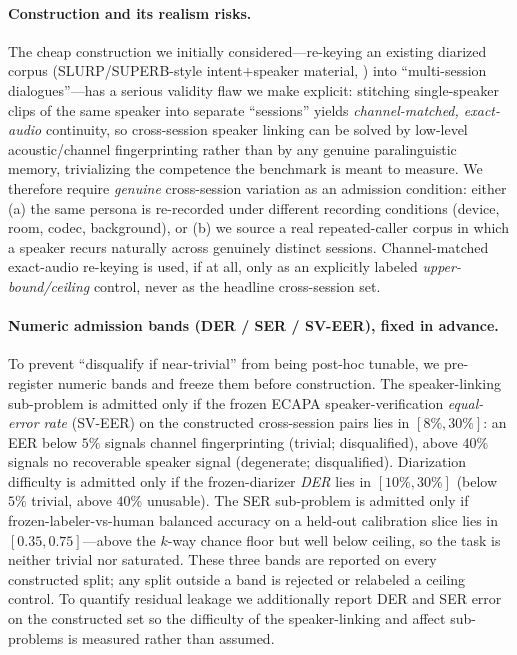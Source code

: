 \paragraph{Construction and its realism risks.} The cheap construction we initially considered---re-keying an existing diarized corpus (SLURP/SUPERB-style intent+speaker material, \citealp{slurp2020,superb2021,dynsuperb2023}) into ``multi-session dialogues''---has a serious validity flaw we make explicit: stitching single-speaker clips of the same speaker into separate ``sessions'' yields \emph{channel-matched, exact-audio} continuity, so cross-session speaker linking can be solved by low-level acoustic/channel fingerprinting rather than by any genuine paralinguistic memory, trivializing the competence the benchmark is meant to measure. We therefore require \emph{genuine} cross-session variation as an admission condition: either (a) the same persona is re-recorded under different recording conditions (device, room, codec, background), or (b) we source a real repeated-caller corpus in which a speaker recurs naturally across genuinely distinct sessions. Channel-matched exact-audio re-keying is used, if at all, only as an explicitly labeled \emph{upper-bound/ceiling} control, never as the headline cross-session set.

\paragraph{Numeric admission bands (DER / SER / SV-EER), fixed in advance.} To prevent ``disqualify if near-trivial'' from being post-hoc tunable, we pre-register numeric bands and freeze them before construction. The speaker-linking sub-problem is admitted only if the frozen ECAPA speaker-verification \emph{equal-error rate} (SV-EER) on the constructed cross-session pairs lies in $[8\%,30\%]$: an EER below $5\%$ signals channel fingerprinting (trivial; disqualified), above $40\%$ signals no recoverable speaker signal (degenerate; disqualified). Diarization difficulty is admitted only if the frozen-diarizer \emph{DER} lies in $[10\%,30\%]$ (below $5\%$ trivial, above $40\%$ unusable). The SER sub-problem is admitted only if frozen-labeler-vs-human balanced accuracy on a held-out calibration slice lies in $[0.35,0.75]$---above the $k$-way chance floor but well below ceiling, so the task is neither trivial nor saturated. These three bands are reported on every constructed split; any split outside a band is rejected or relabeled a ceiling control. To quantify residual leakage we additionally report DER and SER error on the constructed set so the difficulty of the speaker-linking and affect sub-problems is measured rather than assumed.

